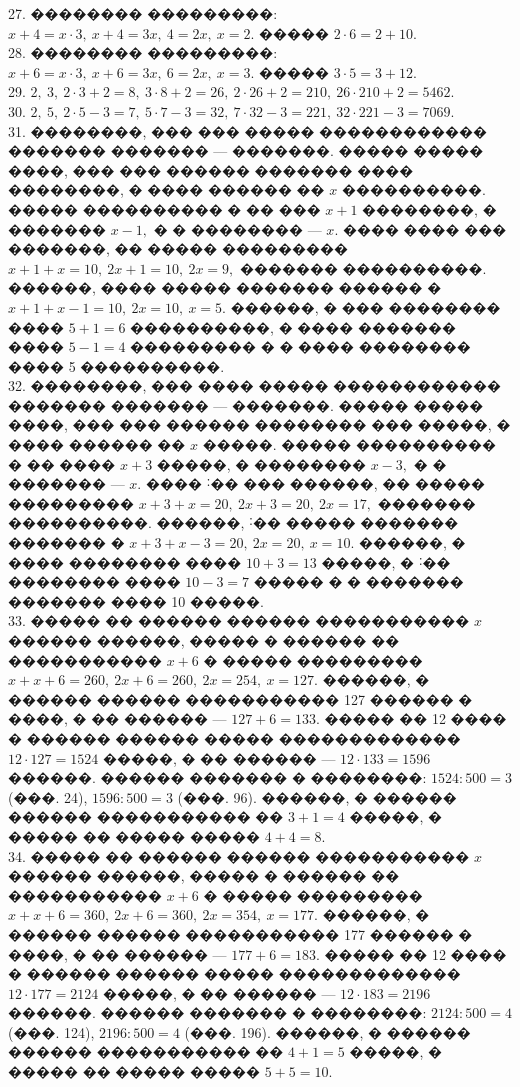 \documentclass[12pt]{article}
\begin{document}
27. �������� ���������: $x+4=x\cdot3,\ x+4=3x,\ 4=2x,\ x=2.$ ����� $2\cdot6=2+10.$\\
28. �������� ���������: $x+6=x\cdot3,\ x+6=3x,\ 6=2x,\ x=3.$ ����� $3\cdot5=3+12.$\\
29. $2,\ 3,\ 2\cdot3+2=8,\ 3\cdot8+2=26,\ 2\cdot26+2=210,\ 26\cdot210+2=5462.$\\
30. $2,\ 5,\ 2\cdot5-3=7,\ 5\cdot7-3=32,\ 7\cdot32-3=221,\ 32\cdot221-3=7069.$\\
31. ��������, ��� ��� ����� ������������ ������� ������� --- �������. ����� ����� ����, ��� ��� ������ ������� ���� ��������, � ���� ������ �� $x$ ����������. ����� ���������� � �� ��� $x+1$ ��������, � ������� $x-1,$ � � �������� --- $x.$ ���� ���� ��� �������, �� ����� ��������� $x+1+x=10,\ 2x+1=10,\ 2x=9,$ ������� ����������. ������, ���� ����� ������� ������ � $x+1+x-1=10,\ 2x=10,\ x=5.$ ������, � ��� �������� ���� $5+1=6$ ����������, � ���� ������� ���� $5-1=4$ ��������� � � ���� �������� ���� 5 ����������.\\
32. ��������, ��� ���� ����� ������������ ������� ������� --- �������. ����� ����� ����, ��� ��� ������ �������� ��� �����, � ���� ������ �� $x$ �����. ����� ���������� � �� ���� $x+3$ �����, � �������� $x-3,$ � � ������� --- $x.$ ���� ˸�� ��� ������, �� ����� ��������� $x+3+x=20,\ 2x+3=20,\ 2x=17,$ ������� ����������. ������, ˸�� ����� ������� ������� � $x+3+x-3=20,\ 2x=20,\ x=10.$ ������, � ���� �������� ���� $10+3=13$ �����, � ˸�� �������� ���� $10-3=7$ ����� � � ������� ������� ���� 10 �����.\\
33. ����� �� ������ ������ ����������� $x$ ������ ������, ����� � ������ �� ����������� $x+6$ � ����� ��������� $x+x+6=260,\ 2x+6=260,\ 2x=254,\ x=127.$ ������, � ������ ������ ����������� 127 ������ � ����, � �� ������ --- $127+6=133.$ ����� �� 12 ���� � ������ ������ ����� ������������� $12\cdot127=1524$ �����, � �� ������ --- $12\cdot133=1596$ ������. ������ ������� � ��������: $1524:500=3$ (���. 24), $1596:500=3$ (���. 96). ������, � ������ ������ ����������� �� $3+1=4$ �����, � ����� �� ����� ����� $4+4=8.$\\
34. ����� �� ������ ������ ����������� $x$ ������ ������, ����� � ������ �� ����������� $x+6$ � ����� ��������� $x+x+6=360,\ 2x+6=360,\ 2x=354,\ x=177.$ ������, � ������ ������ ����������� 177 ������ � ����, � �� ������ --- $177+6=183.$ ����� �� 12 ���� � ������ ������ ����� ������������� $12\cdot177=2124$ �����, � �� ������ --- $12\cdot183=2196$ ������. ������ ������� � ��������: $2124:500=4$ (���. 124), $2196:500=4$ (���. 196). ������, � ������ ������ ����������� �� $4+1=5$ �����, � ����� �� ����� ����� $5+5=10.$\\
\end{document}
